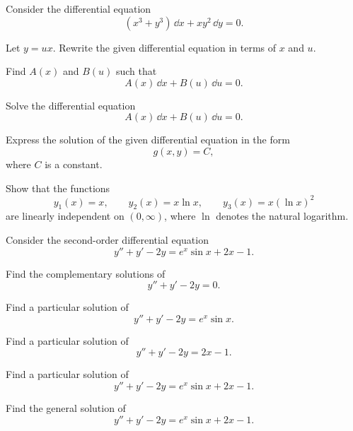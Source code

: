 \documentclass[11pt,oneside]{article}
\begin{document}
\begin{problem}
Consider the differential equation
\[
(x^3+y^3)\,\dd x+xy^2\,\dd y=0.
\]
\begin{problemsubparts}
\item Let $y=ux$. Rewrite the given differential equation in terms of $x$ and $u$.
\item Find $A(x)$ and $B(u)$ such that
\[
A(x)\,\dd x+B(u)\,\dd u=0.
\]
\item Solve the differential equation
\[
A(x)\,\dd x+B(u)\,\dd u=0.
\]
\item Express the solution of the given differential equation in the form
\[
g(x,y)=C,
\]
where $C$ is a constant.
\end{problemsubparts}
\end{problem}

\begin{problem}
Show that the functions
\[
y_1(x)=x,
\qquad
y_2(x)=x\ln x,
\qquad
y_3(x)=x(\ln x)^2
\]
are linearly independent on $(0,\infty)$, where $\ln$ denotes the natural logarithm.
\end{problem}

\begin{problem}
Consider the second-order differential equation
\[
y''+y'-2y=e^x\sin x+2x-1.
\]
\begin{problemsubparts}
\item Find the complementary solutions of
\[
y''+y'-2y=0.
\]
\item Find a particular solution of
\[
y''+y'-2y=e^x\sin x.
\]
\item Find a particular solution of
\[
y''+y'-2y=2x-1.
\]
\item Find a particular solution of
\[
y''+y'-2y=e^x\sin x+2x-1.
\]
\item Find the general solution of
\[
y''+y'-2y=e^x\sin x+2x-1.
\]
\end{problemsubparts}
\end{problem}
\end{document}
